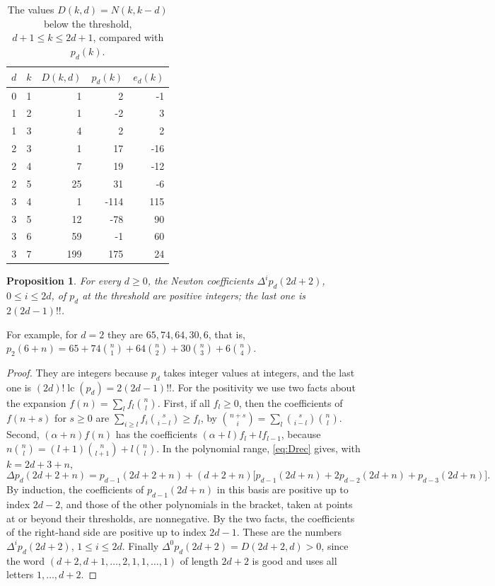 \documentclass[11pt]{amsart}
\newtheorem{proposition}[theorem]{Proposition}
\theoremstyle{definition}
\DeclareMathOperator{\lc}{lc}
\begin{document}
\begin{table}[ht]
\centering
\begin{tabular}{ccrrr}
\toprule
$d$ & $k$ & $D(k,d)$ & $p_d(k)$ & $e_d(k)$\\
\midrule
0 & 1 & 1 & 2 & -1 \\
1 & 2 & 1 & -2 & 3 \\
1 & 3 & 4 & 2 & 2 \\
2 & 3 & 1 & 17 & -16 \\
2 & 4 & 7 & 19 & -12 \\
2 & 5 & 25 & 31 & -6 \\
3 & 4 & 1 & -114 & 115 \\
3 & 5 & 12 & -78 & 90 \\
3 & 6 & 59 & -1 & 60 \\
3 & 7 & 199 & 175 & 24 \\
\bottomrule
\end{tabular}
\caption{The values $D(k,d)=N(k,k-d)$ below the threshold, $d+1\le k\le2d+1$, compared with $p_d(k)$.}\label{tab:exc}
\end{table}

\begin{proposition}\label{prop:newton}
For every $d\ge0$, the Newton coefficients $\Delta^ip_d(2d+2)$, $0\le i\le2d$, of $p_d$ at the threshold are positive integers; the last one is $2(2d-1)!!$.
\end{proposition}

For example, for $d=2$ they are $65, 74, 64, 30, 6$, that is, $p_2(6+n)=65+74\binom n1+64\binom n2+30\binom n3+6\binom n4$.

\begin{proof}
They are integers because $p_d$ takes integer values at integers, and the last one is $(2d)!\lc(p_d)=2(2d-1)!!$. For the positivity we use two facts about the expansion $f(n)=\sum_lf_l\binom nl$. First, if all $f_l\ge0$, then the coefficients of $f(n+s)$ for $s\ge0$ are $\sum_{i\ge l}f_i\binom{s}{i-l}\ge f_l$, by $\binom{n+s}{i}=\sum_l\binom{s}{i-l}\binom nl$. Second, $(\alpha+n)f(n)$ has the coefficients $(\alpha+l)f_l+lf_{l-1}$, because $n\binom nl=(l+1)\binom{n}{l+1}+l\binom nl$. In the polynomial range, \eqref{eq:Drec} gives, with $k=2d+3+n$,
\[
  \Delta p_d(2d+2+n)=p_{d-1}(2d+2+n)+(d+2+n)\bigl[p_{d-1}(2d+n)+2p_{d-2}(2d+n)+p_{d-3}(2d+n)\bigr].
\]
By induction, the coefficients of $p_{d-1}(2d+n)$ in this basis are positive up to index $2d-2$, and those of the other polynomials in the bracket, taken at points at or beyond their thresholds, are nonnegative. By the two facts, the coefficients of the right-hand side are positive up to index $2d-1$. These are the numbers $\Delta^{i}p_d(2d+2)$, $1\le i\le2d$. Finally $\Delta^0p_d(2d+2)=D(2d+2,d)>0$, since the word $(d+2,d+1,\dots,2,1,1,\dots,1)$ of length $2d+2$ is good and uses all letters $1,\dots,d+2$.
\end{proof}
\end{document}
